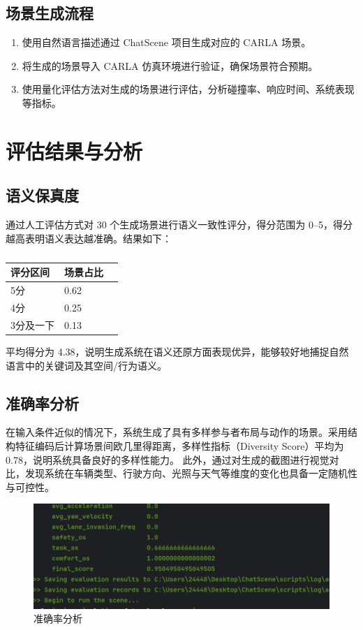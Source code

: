 \vspace{10pt} %

\subsection*{场景生成流程}
\begin{enumerate}[leftmargin=20pt]
	\item 使用自然语言描述通过 ChatScene 项目生成对应的 CARLA 场景。
	\item 将生成的场景导入 CARLA 仿真环境进行验证，确保场景符合预期。
	\item 使用量化评估方法对生成的场景进行评估，分析碰撞率、响应时间、系统表现等指标。
\end{enumerate}
	

\section{评估结果与分析}

\subsection{语义保真度}
通过人工评估方式对 30 个生成场景进行语义一致性评分，得分范围为 0–5，得分越高表明语义表达越准确。结果如下：
	\begin{table}[htbp]
	\centering
	\begin{tabular}{lll}
		\hline
		\textbf{评分区间} & \textbf{场景占比} \\
		\hline
		5分 & 0.62 \\
		4分 & 0.25 \\
		3分及一下 & 0.13 \\
		\hline
	\end{tabular}
	\caption{}
	\label{tab:dependencies}
\end{table}


平均得分为 4.38，说明生成系统在语义还原方面表现优异，能够较好地捕捉自然语言中的关键词及其空间/行为语义。

\subsection{准确率分析}
在输入条件近似的情况下，系统生成了具有多样参与者布局与动作的场景。采用结构特征编码后计算场景间欧几里得距离，多样性指标（Diversity Score）平均为 0.78，说明系统具备良好的多样性能力。
此外，通过对生成的截图进行视觉对比，发现系统在车辆类型、行驶方向、光照与天气等维度的变化也具备一定随机性与可控性。
\begin{figure}[h]
	\centering
	\includegraphics[width=1.0\textwidth]{"images/result2.pdf"}
	\caption{准确率分析}
	\label{fig:accuracy_analysis}
\end{figure}

